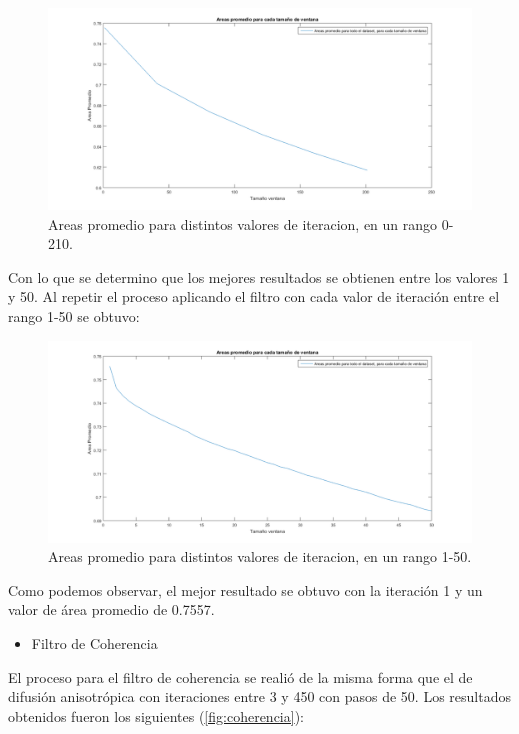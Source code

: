 \begin{figure}[H]
	{
	\centering
	\includegraphics[width=1\textwidth]{Figures/AnisotropicoRangoGrande}
	\caption[Difusión Anisotrópica]{Areas promedio para distintos valores de iteracion, en un rango 0-210.}
	\label{fig:anisotropica}
	}
\end{figure}

Con lo que se determino que los mejores resultados se obtienen entre los valores 1 y 50. Al repetir el proceso aplicando el filtro con cada valor de iteración entre el rango 1-50 se obtuvo:

\begin{figure}[H]
	{
	\centering
	\includegraphics[width=1\textwidth]{Figures/AnisotropicoRangoChico}
	\caption[Area promedio en el rango 1 -50]{Areas promedio para distintos valores de iteracion, en un rango 1-50.}
	}
\end{figure}

Como podemos observar, el mejor resultado se obtuvo con la iteración 1 y un valor de  área promedio de 0.7557.

\begin{itemize}
	\item[]Filtro de Coherencia
\end{itemize}

El proceso para el filtro de coherencia se reali\'o de la misma forma que el de difusi\'on anisotr\'opica con iteraciones entre 3 y 450 con pasos de 50. Los resultados obtenidos fueron los siguientes (\ref{fig:coherencia}):

